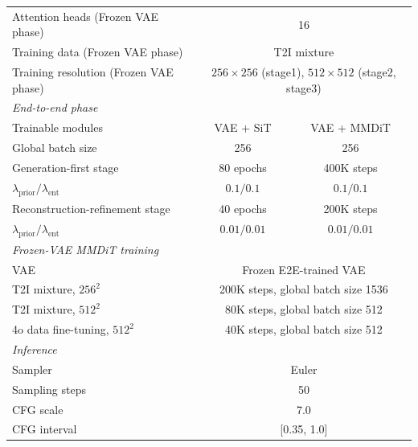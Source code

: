 \begin{table}[t]
\begin{tabular}{lcc}
Attention heads (Frozen VAE phase)
& \multicolumn{2}{c}{16} \\

Training data (Frozen VAE phase)
& \multicolumn{2}{c}{T2I mixture} \\

Training resolution (Frozen VAE phase)
& \multicolumn{2}{c}{$256\times256$ (stage1), $512\times512$ (stage2, stage3)}\\

\midrule
\multicolumn{3}{l}{\textit{End-to-end phase}} \\
\midrule

Trainable modules
& VAE + SiT
& VAE + MMDiT \\

Global batch size 
& 256 
& 256 \\

Generation-first stage
& 80 epochs
& 400K steps \\

$\lambda_{\mathrm{prior}} / \lambda_{\mathrm{ent}}$
& $0.1 / 0.1$
& $0.1 / 0.1$ \\

Reconstruction-refinement stage
& 40 epochs
& 200K steps \\

$\lambda_{\mathrm{prior}} / \lambda_{\mathrm{ent}}$
& $0.01 / 0.01$
& $0.01 / 0.01$ \\

\midrule
\multicolumn{3}{l}{\textit{Frozen-VAE MMDiT training}} \\
\midrule

VAE
& \multicolumn{2}{c}{Frozen E2E-trained VAE} \\

T2I mixture, $256^2$
& \multicolumn{2}{c}{200K steps, global batch size 1536} \\

T2I mixture, $512^2$
& \multicolumn{2}{c}{80K steps, global batch size 512} \\

4o data fine-tuning, $512^2$
& \multicolumn{2}{c}{40K steps, global batch size 512} \\

\midrule
\multicolumn{3}{l}{\textit{Inference}} \\
\midrule

Sampler
& \multicolumn{2}{c}{Euler} \\

Sampling steps
& \multicolumn{2}{c}{50} \\

CFG scale
& \multicolumn{2}{c}{7.0} \\

CFG interval
& \multicolumn{2}{c}{[0.35, 1.0]} \\

\bottomrule
\end{tabular}
\end{table}


